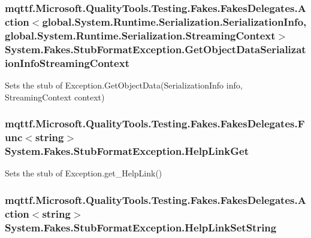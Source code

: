 \hypertarget{class_system_1_1_fakes_1_1_stub_format_exception_a68c62e26f23edcc2568e6b14c86c055a}{
\subsubsection[{Get\-Object\-Data\-Serialization\-Info\-Streaming\-Context}]{\setlength{\rightskip}{0pt plus 5cm}mqttf.\-Microsoft.\-Quality\-Tools.\-Testing.\-Fakes.\-Fakes\-Delegates.\-Action$<$global.\-System.\-Runtime.\-Serialization.\-Serialization\-Info, global.\-System.\-Runtime.\-Serialization.\-Streaming\-Context$>$ System.\-Fakes.\-Stub\-Format\-Exception.\-Get\-Object\-Data\-Serialization\-Info\-Streaming\-Context}}\label{class_system_1_1_fakes_1_1_stub_format_exception_a68c62e26f23edcc2568e6b14c86c055a}


Sets the stub of Exception.\-Get\-Object\-Data(\-Serialization\-Info info, Streaming\-Context context)

\hypertarget{class_system_1_1_fakes_1_1_stub_format_exception_a9a2cd8bcce050b7c46a4ddfbf69b7c7e}{
\subsubsection[{Help\-Link\-Get}]{\setlength{\rightskip}{0pt plus 5cm}mqttf.\-Microsoft.\-Quality\-Tools.\-Testing.\-Fakes.\-Fakes\-Delegates.\-Func$<$string$>$ System.\-Fakes.\-Stub\-Format\-Exception.\-Help\-Link\-Get}}\label{class_system_1_1_fakes_1_1_stub_format_exception_a9a2cd8bcce050b7c46a4ddfbf69b7c7e}


Sets the stub of Exception.\-get\-\_\-\-Help\-Link()

\hypertarget{class_system_1_1_fakes_1_1_stub_format_exception_ac161e64b8e3a005e72886ab01df9b9b5}{
\subsubsection[{Help\-Link\-Set\-String}]{\setlength{\rightskip}{0pt plus 5cm}mqttf.\-Microsoft.\-Quality\-Tools.\-Testing.\-Fakes.\-Fakes\-Delegates.\-Action$<$string$>$ System.\-Fakes.\-Stub\-Format\-Exception.\-Help\-Link\-Set\-String}}\label{class_system_1_1_fakes_1_1_stub_format_exception_ac161e64b8e3a005e72886ab01df9b9b5}


